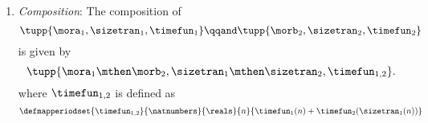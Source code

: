 \begin{definition}
\begin{enumerate}
        \item \emph{Composition}: The composition of
              \begin{equation}
                  \tupp{\mora_1, \sizetran_1,  \timefun_1  }
                  \qqand
                  \tupp{\morb_2, \sizetran_2,  \timefun_2  }
              \end{equation}
              is given by
              \begin{equation}
                  \tupp{
                      \mora_1 \mthen \morb_2,
                      \sizetran_1 \mthen \sizetran_2,
                      \timefun_{1,2}
                  }.
              \end{equation}
              where $\timefun_{1,2}$ is defined as
              \begin{equation}
                  \label{eq:timefun-composition}
                  \defmapperiodset{
                      \timefun_{1,2}
                  }{
                      \natnumbers
                  }{
                      \reals
                  }{
                      n
                  }{
                      \timefun_1(n) + \timefun_2(\sizetran_1(n))
                  }
              \end{equation}
    \end{enumerate}
\end{definition}

